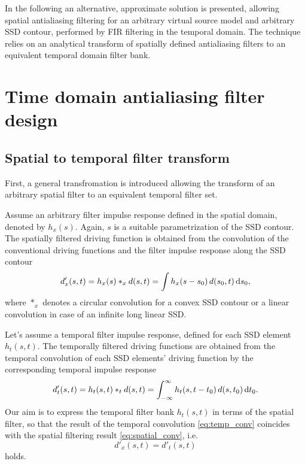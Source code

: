 \documentclass[conference]{IEEEtran}
\begin{document}
In the following an alternative, approximate solution is presented, allowing spatial antialiasing filtering for an arbitrary virtual source model and arbitrary SSD contour, performed by FIR filtering in the temporal domain.
The technique relies on an analytical transform of spatially defined antialiasing filters to an equivalent temporal domain filter bank. 

\section{Time domain antialiasing filter design}

\subsection{Spatial to temporal filter transform}
First, a general transfromation is introduced allowing the transform of an arbitrary spatial filter to an equivalent temporal filter set.

Assume an arbitrary filter impulse response defined in the spatial domain, denoted by $h_x(s)$.
Again, $s$ is a suitable parametrization of the SSD contour.
The spatially filtered driving function is obtained from the convolution of the conventional driving functions and the filter impulse response along the SSD contour
\begin{equation}
    d'_x(s,t) = h_x(s) \ast_x d(s,t) = \int h_x(s-s_0) \, d(s_0,t) \, \td s_0,
    \label{eq:spatial_conv}
\end{equation}
where $\ast_x$ denotes a circular convolution for a convex SSD contour or a linear convolution in case of an infinite long linear SSD.

Let's assume a temporal filter impulse response, defined for each SSD element $h_t(s,t)$.
The temporally filtered driving functions are obtained from the temporal convolution of each SSD elements' driving function by the corresponding temporal impulse response
\begin{equation}
    d'_t(s,t) = h_t(s,t) \ast_t d(s,t) = \int_{-\infty}^{\infty} h_t(s,t-t_0) \, d(s,t_0) \, \td t_0.
    \label{eq:temp_conv}
\end{equation}
Our aim is to express the temporal filter bank $h_t(s,t)$ in terms of the spatial filter, so that the result of the temporal convolution \eqref{eq:temp_conv} coincides with the spatial filtering result \eqref{eq:spatial_conv}, i.e.
\begin{equation}
    d'_x(s,t) = d'_t(s,t)
\end{equation}
holds.
\end{document}
